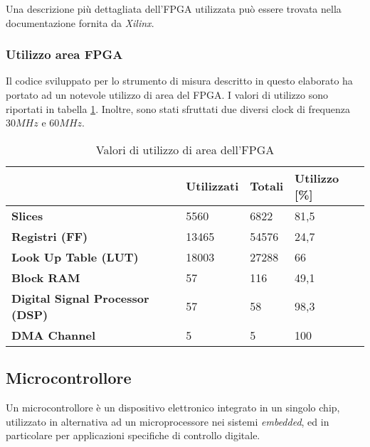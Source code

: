 Una descrizione più dettagliata dell'FPGA utilizzata può essere trovata nella documentazione fornita da \textit{Xilinx}\cite{dsxilinx}.

\subsubsection{Utilizzo area FPGA}
Il codice sviluppato per lo strumento di misura descritto in questo elaborato ha portato ad un notevole utilizzo di area del FPGA. I valori di utilizzo sono riportati in tabella \ref{tabarea}. Inoltre, sono stati sfruttati due diversi clock di frequenza $30MHz$ e $60MHz$.

\begin{table}[ht]
\centering
\begin{tabular}{l|l|l|l}
                                        & \textbf{Utilizzati} & \textbf{Totali} & \textbf{Utilizzo {[}\%{]}} \\ \hline
\textbf{Slices}                         & 5560                & 6822            & 81,5                                      \\
\textbf{Registri (FF)}                  & 13465               & 54576           & 24,7                                      \\
\textbf{Look Up Table (LUT)}            & 18003               & 27288           & 66                                        \\
\textbf{Block RAM}                      & 57                  & 116             & 49,1                                      \\
\textbf{Digital Signal Processor (DSP)} & 57                  & 58              & 98,3                                      \\
\textbf{DMA Channel}                    & 5                   & 5               & 100                                      
\end{tabular}
\caption{Valori di utilizzo di area dell'FPGA}
\label{tabarea}
\end{table}

\subsection{Microcontrollore}
Un microcontrollore è un dispositivo elettronico integrato in un singolo chip, utilizzato in alternativa ad un microprocessore nei sistemi \textit{embedded}, ed in particolare per applicazioni specifiche di controllo digitale.

